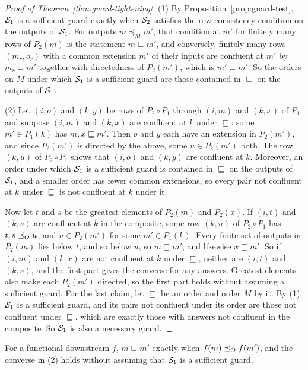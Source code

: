 \begin{proof}[Proof of Theorem~\ref{thm:guard-tightening}]
(1) By Proposition~\ref{prop:guard-test}, $\mathcal{S}_1$ is a sufficient guard exactly when
$\mathcal{S}_2$ satisfies the row-consistency condition on the outputs of
$\mathcal{S}_1$.  For outputs $m\preceq_M m'$, that condition at $m'$ for finitely
many rows of $P_2(m)$ is the statement $m\sqsubseteq m'$, and conversely,
finitely many rows $(m_r,o_r)$ with a common extension $m'$ of their inputs
are confluent at $m'$ by $m_r\sqsubseteq m'$ together with directedness of
$P_2(m')$, which is $m'\sqsubseteq m'$.  So the orders on $M$ under which
$\mathcal{S}_1$ is a sufficient guard are those contained in $\sqsubseteq$ on the
outputs of $\mathcal{S}_1$.

(2) Let $(i,o)$ and $(k,y)$ be rows of $P_2\circ P_1$ through $(i,m)$ and
$(k,x)$ of $P_1$, and suppose $(i,m)$ and $(k,x)$ are confluent at $k$ under
$\sqsubseteq$: some $m'\in P_1(k)$ has $m,x\sqsubseteq m'$.  Then $o$ and $y$
each have an extension in $P_2(m')$, and since $P_2(m')$ is directed by the above,
some $u\in P_2(m')$ \outrel both.  The row $(k,u)$ of $P_2\circ P_1$ shows
that $(i,o)$ and $(k,y)$ are confluent at $k$.  Moreover, an
order under which $\mathcal{S}_1$ is a sufficient guard is contained in $\sqsubseteq$ on the
outputs of $\mathcal{S}_1$, and a smaller order has fewer common extensions,
so every pair not confluent at $k$ under $\sqsubseteq$ is not confluent at $k$ under it.

Now let $t$ and $s$ be the greatest elements of $P_2(m)$ and $P_2(x)$.  If
$(i,t)$ and $(k,s)$ are confluent at $k$ in the composite, some row $(k,u)$
of $P_2\circ P_1$ has $t,s\preceq_O u$, and $u\in P_2(m')$ for some
$m'\in P_1(k)$.  Every finite set of outputs in $P_2(m)$ lies below $t$, and
so below $u$, so $m\sqsubseteq m'$, and likewise $x\sqsubseteq m'$.  So
if $(i,m)$ and $(k,x)$ are not confluent at $k$ under $\sqsubseteq$, neither are
$(i,t)$ and $(k,s)$, and the first part gives the converse for any answers.
Greatest elements also make each $P_2(m')$ directed, so the first part holds
without assuming a sufficient guard.
For the last claim, let $\sqsubseteq$ be an order and order $M$ by it.  By
(1), $\mathcal{S}_1$ is a sufficient guard, and its pairs not confluent under its
order are those not confluent under $\sqsubseteq$, which are exactly those
with answers not confluent in the composite.  So $\mathcal{S}_1$ is also a
necessary guard.
\end{proof}

For a functional downstream $f$, $m\sqsubseteq m'$ exactly when $f(m)\preceq_O
f(m')$, and the converse in (2) holds without assuming that $\mathcal{S}_1$ is a
sufficient guard.

